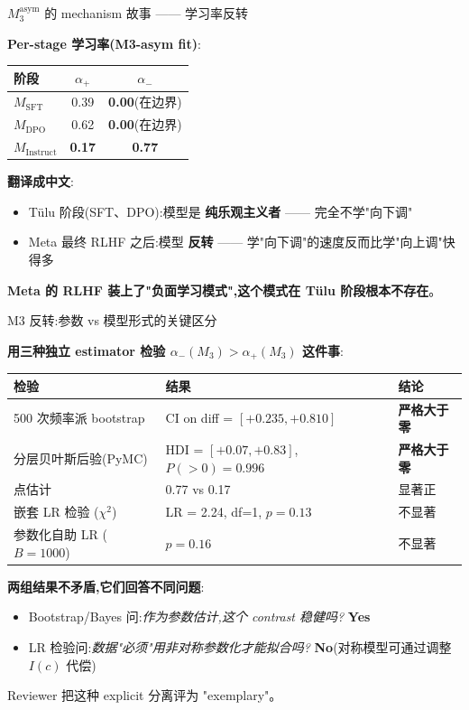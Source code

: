 \documentclass[aspectratio=169,11pt]{ctexbeamer}
\newcommand{\hi}[1]{\textcolor{ow-red}{\textbf{#1}}}
\newcommand{\hib}[1]{\textcolor{ow-blue}{\textbf{#1}}}
\newcommand{\sub}[1]{{\small\color{ow-gray}#1}}
\begin{document}
\begin{frame}{$M_3^\text{asym}$ 的 mechanism 故事 —— 学习率反转}

\textbf{Per-stage 学习率(M3-asym fit)}:

\begin{center}\small
\begin{tabular}{lcc}
\toprule
阶段 & $\alpha_+$ & $\alpha_-$ \\
\midrule
$M_\text{SFT}$ & 0.39 & \hib{0.00}(在边界) \\
$M_\text{DPO}$ & 0.62 & \hib{0.00}(在边界) \\
$M_\text{Instruct}$ & \hi{0.17} & \hi{0.77} \\
\bottomrule
\end{tabular}
\end{center}

\bigskip
\textbf{翻译成中文}:
\begin{itemize}
\item Tülu 阶段(SFT、DPO):模型是 \hib{纯乐观主义者} —— 完全不学"向下调"
\item Meta 最终 RLHF 之后:模型 \hi{反转} —— 学"向下调"的速度反而比学"向上调"快得多
\end{itemize}

\bigskip
\hi{Meta 的 RLHF 装上了"负面学习模式",这个模式在 Tülu 阶段根本不存在}。
\end{frame}

\begin{frame}{M3 反转:参数 vs 模型形式的关键区分}

\textbf{用三种独立 estimator 检验 $\alpha_-(M_3) > \alpha_+(M_3)$ 这件事}:

\begin{center}\small
\begin{tabular}{p{4cm}p{6cm}p{2cm}}
\toprule
检验 & 结果 & 结论 \\
\midrule
500 次频率派 bootstrap & CI on diff = $[+0.235, +0.810]$ & \hi{严格大于零} \\
分层贝叶斯后验(PyMC) & HDI = $[+0.07, +0.83]$, $P(>0)=0.996$ & \hi{严格大于零} \\
点估计 & 0.77 vs 0.17 & 显著正 \\
\midrule
嵌套 LR 检验 ($\chi^2$) & LR = 2.24, df=1, $p = 0.13$ & 不显著 \\
参数化自助 LR ($B=1000$) & $p = 0.16$ & 不显著 \\
\bottomrule
\end{tabular}
\end{center}

\bigskip
\hib{两组结果不矛盾,它们回答不同问题}:
\begin{itemize}
\item Bootstrap/Bayes 问:\textit{作为参数估计,这个 contrast 稳健吗?} \hi{Yes}
\item LR 检验问:\textit{数据"必须"用非对称参数化才能拟合吗?} \hi{No}(对称模型可通过调整 $I(c)$ 代偿)
\end{itemize}

\bigskip
\sub{Reviewer 把这种 explicit 分离评为 "exemplary"。}
\end{frame}
\end{document}

